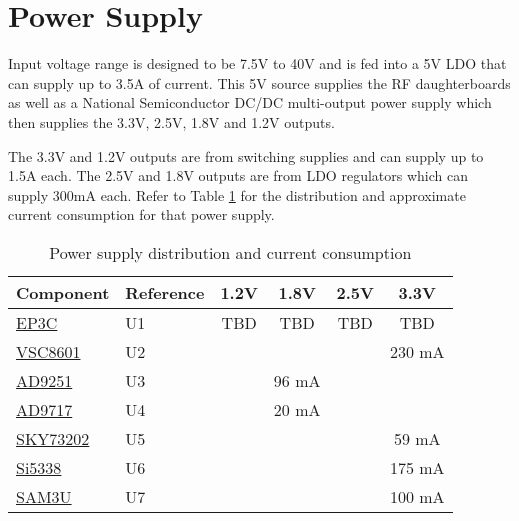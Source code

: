 \section{Power Supply} %
\label{sec:power}
    Input voltage range is designed to be 7.5V to 40V and is fed into a 5V LDO that can supply up to 
    3.5A of current.  This 5V source supplies the RF daughterboards as well as a National Semiconductor
    DC/DC multi-output power supply which then supplies the 3.3V, 2.5V, 1.8V and 1.2V outputs.
    
    The 3.3V and 1.2V outputs are from switching supplies and can supply up to 1.5A each.  The 2.5V and 1.8V
    outputs are from LDO regulators which can supply 300mA each.  Refer to Table \ref{table:currentconsumption} for 
    the distribution and approximate current consumption for that power supply.
    
    \begin{table}[here]
        \begin{center}
            \begin{tabular}{|l|l|c|c|c|c|}
                \hline
                Component   & Reference             & 1.2V      & 1.8V      & 2.5V      & 3.3V      \\ \hline 
                \hline
                \hyperref[sec:fpga]{EP3C}           & U1        & TBD       & TBD       & TBD       & TBD       \\ \hline
                \hyperref[sec:gige]{VSC8601}        & U2        & \-        & \-        & \-        & 230 mA    \\ \hline
                \hyperref[sec:adc]{AD9251}          & U3        & \-        & 96 mA     & \-        & \-        \\ \hline
                \hyperref[sec:dac]{AD9717}          & U4        & \-        & 20 mA     & \-        & \-        \\ \hline
                \hyperref[sec:sky73202]{SKY73202}   & U5        & \-        & \-        & \-        & 59 mA     \\ \hline
                \hyperref[sec:clock]{Si5338}        & U6        & \-        & \-        & \-        & 175 mA    \\ \hline
                \hyperref[sec:sam3u]{SAM3U}         & U7        & \-        & \-        & \-        & 100 mA    \\ \hline 
            \end{tabular}
            \caption{Power supply distribution and current consumption}
            \label{table:currentconsumption}
        \end{center}
    \end{table}
    

